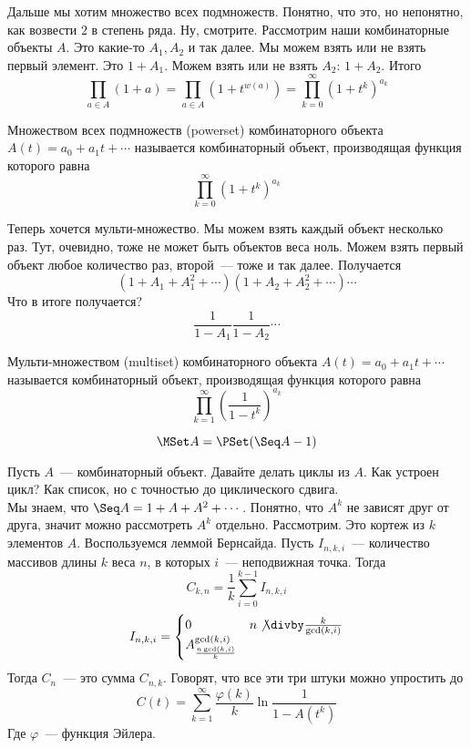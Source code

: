 \documentclass{article}
\begin{document}
    \begin{remark}
        Дальше мы хотим множество всех подмножеств. Понятно, что это, но непонятно, как возвести $2$ в степень ряда. Ну, смотрите. Рассмотрим наши комбинаторные объекты $A$. Это какие-то $A_1,A_2$ и так далее. Мы можем взять или не взять первый элемент. Это $1+A_1$. Можем взять или не взять $A_2$: $1+A_2$. Итого
        $$
        \prod\limits_{a\in A}(1+a)=\prod\limits_{a\in A}(1+t^{w(a)})=\prod\limits_{k=0}^\infty(1+t^k)^{a_k}
        $$
    \end{remark}
    \begin{definition}
        Множеством всех подмножеств (powerset) комбинаторного объекта $A(t)=a_0+a_1t+\cdots$ называется комбинаторный объект, производящая функция которого равна
        $$
        \prod\limits_{k=0}^\infty(1+t^k)^{a_k}
        $$
    \end{definition}
    \begin{remark}
        Теперь хочется мульти-множество. Мы можем взять каждый объект несколько раз. Тут, очевидно, тоже не может быть объектов веса ноль. Можем взять первый объект любое количество раз, второй~--- тоже и так далее. Получается
        $$
        \left(1+A_1+A_1^2+\cdots\right)\left(1+A_2+A_2^2+\cdots\right)\cdots
        $$
        Что в итоге получается?
        $$
        \frac1{1-A_1}\frac1{1-A_2}\cdots
        $$
    \end{remark}
    \begin{definition}
        Мульти-множеством (multiset) комбинаторного объекта $A(t)=a_0+a_1t+\cdots$ называется комбинаторный объект, производящая функция которого равна
        $$
        \prod\limits_{k=1}^\infty\left(\frac1{1-t^k}\right)^{a_k}
        $$
    \end{definition}
    \begin{claim}
        $$
        \MSet A=\PSet(\Seq A-1)
        $$
    \end{claim}
    \begin{remark}
        Пусть $A$~--- комбинаторный объект. Давайте делать циклы из $A$. Как устроен цикл? Как список, но с точностью до циклического сдвига.\\
        Мы знаем, что $\Seq A=1+A+A^2+\cdots$. Понятно, что $A^k$ не зависят друг от друга, значит можно рассмотреть $A^k$ отдельно. Рассмотрим. Это кортеж из $k$ элементов $A$. Воспользуемся леммой Бернсайда. Пусть $I_{n,k,i}$~--- количество массивов длины $k$ веса $n$, в которых $i$~--- неподвижная точка. Тогда
        $$
        C_{k,n}=\frac1k\sum\limits_{i=0}^{k-1}I_{n,k,i}
        $$
        $$
        I_{n,k,i}=\begin{cases}
            0 & n\not\divby\frac k{\gcd(k,i)}\\
            A^{\gcd(k,i)}_{\frac{n\gcd(k,i)}k} &
        \end{cases}
        $$
        Тогда $C_n$~--- это сумма $C_{n,k}$. Говорят, что все эти три штуки можно упростить до
        $$
        C(t)=\sum\limits_{k=1}^\infty\frac{\varphi(k)}k\ln\frac1{1-A(t^k)}
        $$
        Где $\varphi$~--- функция Эйлера.
    \end{remark}
\end{document}
